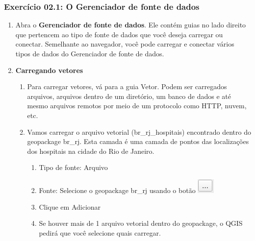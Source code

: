 \documentclass[
]{book}
\providecommand{\tightlist}{%
  \setlength{\itemsep}{0pt}\setlength{\parskip}{0pt}}
\begin{document}
\hypertarget{exercuxedcio-02.1-o-gerenciador-de-fonte-de-dados}{%
\subsubsection{\texorpdfstring{\textbf{Exercício 02.1: O Gerenciador de fonte de dados}}{Exercício 02.1: O Gerenciador de fonte de dados}}\label{exercuxedcio-02.1-o-gerenciador-de-fonte-de-dados}}

\begin{enumerate}
\def\labelenumi{\arabic{enumi}.}
\item
  Abra o \textbf{Gerenciador de fonte de dados}. Ele contém guias no lado direito que pertencem ao tipo de fonte de dados que você deseja carregar ou conectar. Semelhante ao navegador, você pode carregar e conectar vários tipos de dados do Gerenciador de fonte de dados.
\item
  \textbf{Carregando vetores}

  \begin{enumerate}
  \def\labelenumii{\arabic{enumii}.}
  \item
    Para carregar vetores, vá para a guia Vetor. Podem ser carregados arquivos, arquivos dentro de um diretório, um banco de dados e até mesmo arquivos remotos por meio de um protocolo como HTTP, nuvem, etc.
  \item
    Vamos carregar o arquivo vetorial (br\_rj\_hospitais) encontrado dentro do geopackage br\_rj. Esta camada é uma camada de pontos das localizações dos hospitais na cidade do Rio de Janeiro.

    \begin{enumerate}
    \def\labelenumiii{\arabic{enumiii}.}
    \tightlist
    \item
      Tipo de fonte: Arquivo
    \item
      Fonte: Selecione o geopackage br\_rj usando o botão \includegraphics{media/modulo2/data-source-manager-search.png}
    \item
      Clique em Adicionar
    \item
      Se houver mais de 1 arquivo vetorial dentro do geopackage, o QGIS pedirá que você selecione quais carregar.
    \end{enumerate}
  \end{enumerate}
\end{enumerate}
\end{document}

